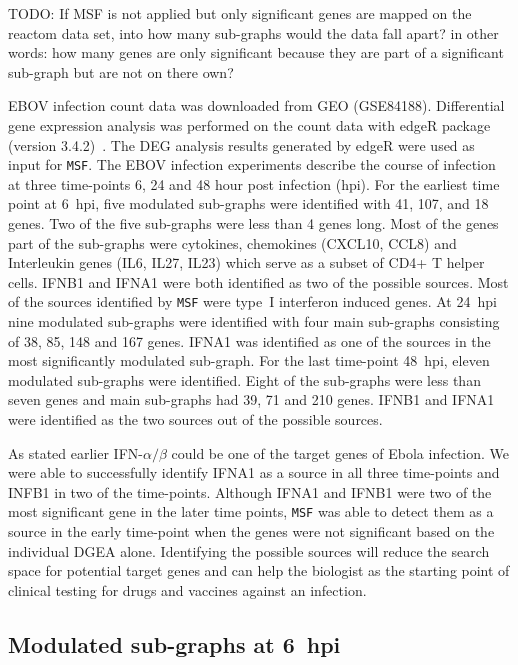 \documentclass[10pt,a4paper,twocolumn]{article}
\newcommand{\TODO}[1]{\begingroup\color{red}#1\endgroup}
\begin{document}
\TODO{TODO: If MSF is not applied but only significant genes are mapped on
  the reactom data set, into how many sub-graphs would the data fall apart?
  in other words: how many genes are only significant because they are part
  of a significant sub-graph but are not on there own?}

EBOV infection count data was downloaded from GEO (GSE84188). Differential
gene expression analysis was performed on the count data with edgeR package
(version 3.4.2)~\cite{edgeR}. The DEG analysis results generated by edgeR
were used as input for \texttt{MSF}. The EBOV infection experiments
describe the course of infection at three time-points 6, 24 and 48 hour
post infection (hpi). For the earliest time point at 6~hpi, five modulated
sub-graphs were identified with 41, 107, and 18 genes. Two of the five
sub-graphs were less than 4 genes long. Most of the genes part of the
sub-graphs were cytokines, chemokines (CXCL10, CCL8) and Interleukin genes
(IL6, IL27, IL23) which serve as a subset of CD4+ T helper cells. IFNB1 and
IFNA1 were both identified as two of the possible sources. Most of the
sources identified by \texttt{MSF} were type~I interferon induced genes. At
24~hpi nine modulated sub-graphs were identified with four main sub-graphs
consisting of 38, 85, 148 and 167 genes. IFNA1 was identified as one of the
sources in the most significantly modulated sub-graph. For the last
time-point 48~hpi, eleven modulated sub-graphs were identified. Eight of
the sub-graphs were less than seven genes and main sub-graphs had 39, 71
and 210 genes. IFNB1 and IFNA1 were identified as the two sources out of
the possible sources.

As stated earlier IFN-$\alpha / \beta$ could be one of the target
genes of Ebola infection. We were able to successfully identify IFNA1
as a source in all three time-points and INFB1 in two of the
time-points. Although IFNA1 and IFNB1 were two of the most significant
gene in the later time points, \texttt{MSF} was able to detect them as
a source in the early time-point when the genes were not significant
based on the individual DGEA alone. Identifying the possible sources will
reduce the search space for potential target genes and can help the
biologist as the starting point of clinical testing for drugs and
vaccines against an infection.



\subsection*{Modulated sub-graphs at 6~hpi}
\end{document}
